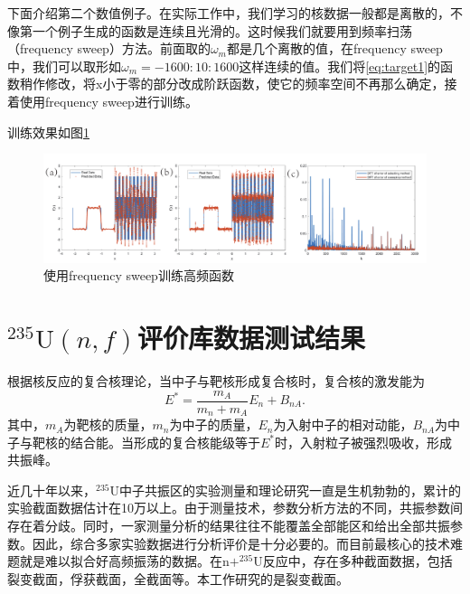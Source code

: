
下面介绍第二个数值例子。在实际工作中，我们学习的核数据一般都是离散的，不像第一个例子生成的函数是连续且光滑的。这时候我们就要用到频率扫荡（frequency sweep）方法。前面取的$\omega _m$都是几个离散的值，在frequency sweep中，我们可以取形如$\omega _m=-1600:10:1600$这样连续的值。我们将\ref{eq:target1}的函数稍作修改，将x小于零的部分改成阶跃函数，使它的频率空间不再那么确定，接着使用frequency sweep进行训练。

训练效果如图\ref{sweep}
\begin{figure}[htbp!]
  \centering
  \includegraphics[width=0.84\linewidth]{figures/PPSDNN/1D-square.pdf}
  \caption{使用frequency sweep训练高频函数}
  \label{sweep}
\end{figure}


\section{$^{235}\text{U}(n,f)$评价库数据测试结果}
根据核反应的复合核理论，当中子与靶核形成复合核时，复合核的激发能为
\begin{equation}\label{}
  E^{\ast } = \frac{m_A}{m_n+m_A}E_n+B_{nA}.
\end{equation}
其中，$m_A$为靶核的质量，$m_n$为中子的质量，$E_n$为入射中子的相对动能，$B_{nA}$为中子与靶核的结合能。当形成的复合核能级等于$E^{\ast }$时，入射粒子被强烈吸收，形成共振峰。

近几十年以来，$^{235}\text{U}$中子共振区的实验测量和理论研究一直是生机勃勃的，累计的实验截面数据估计在10万以上。由于测量技术，参数分析方法的不同，共振参数间存在着分歧。同时，一家测量分析的结果往往不能覆盖全部能区和给出全部共振参数。因此，综合多家实验数据进行分析评价是十分必要的\cite{何锦昌1990中子共振参数的联合拟合分析}。而目前最核心的技术难题就是难以拟合好高频振荡的数据。在$\text{n}+^{235}\text{U}$反应中，存在多种截面数据，包括裂变截面，俘获截面，全截面等。本工作研究的是裂变截面。


